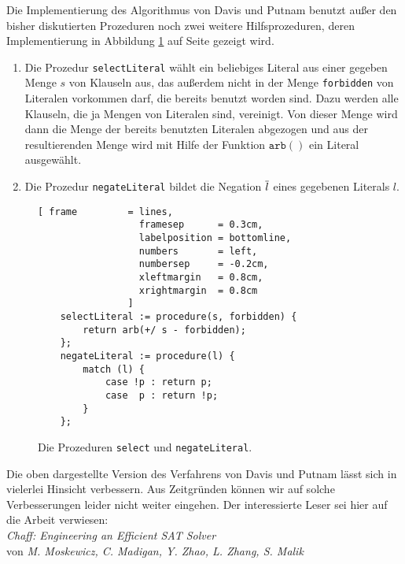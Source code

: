 Die Implementierung des Algorithmus von Davis und Putnam benutzt au\ss{}er den bisher diskutierten Prozeduren
noch zwei weitere Hilfsprozeduren, deren Implementierung in 
Abbildung \ref{fig:solve-aux} auf Seite \pageref{fig:solve-aux} gezeigt wird.
\begin{enumerate}
\item Die Prozedur \texttt{selectLiteral} w\"{a}hlt ein beliebiges Literal aus 
      einer gegeben Menge $s$ von Klauseln aus, das au\ss{}erdem nicht in der Menge
      \texttt{forbidden} von Literalen vorkommen darf, die bereits benutzt worden sind.
      Dazu werden alle Klauseln, die ja Mengen von Literalen sind, vereinigt.  Von dieser
      Menge wird dann die Menge der bereits benutzten Literalen abgezogen und aus der
      resultierenden Menge wird mit Hilfe der Funktion $\texttt{arb}()$ ein Literal ausgew\"{a}hlt.
\item Die Prozedur \texttt{negateLiteral} bildet die Negation $\overline{l}$ 
      eines gegebenen Literals $l$.  
\end{enumerate}
\begin{figure}[!ht]
  \centering
\begin{Verbatim}[ frame         = lines, 
                  framesep      = 0.3cm, 
                  labelposition = bottomline,
                  numbers       = left,
                  numbersep     = -0.2cm,
                  xleftmargin   = 0.8cm,
                  xrightmargin  = 0.8cm
                ]
    selectLiteral := procedure(s, forbidden) {
        return arb(+/ s - forbidden);
    };
    negateLiteral := procedure(l) {
        match (l) {
            case !p : return p;
            case  p : return !p;
        }
    };
\end{Verbatim}
\vspace*{-0.3cm}
  \caption{Die Prozeduren \texttt{select} und \texttt{negateLiteral}.}
  \label{fig:solve-aux}
\end{figure}

Die oben dargestellte Version des Verfahrens von Davis und Putnam l\"{a}sst sich in vielerlei
Hinsicht verbessern.  Aus Zeitgr\"{u}nden k\"{o}nnen wir auf solche Verbesserungen leider nicht
weiter eingehen. Der interessierte Leser sei hier auf die Arbeit \cite{moskewicz01}  verwiesen:
\\[0.2cm]
\hspace*{1.3cm} \textsl{Chaff: Engineering an Efficient SAT Solver} \\
\hspace*{1.3cm} von \emph{\color{blue}M. Moskewicz, C. Madigan, Y. Zhao, L. Zhang, S. Malik} 


